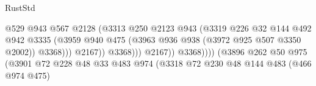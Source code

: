 \begin{lexlean}{RustStd}
\begin{coremodule}
{\begin{coremodule}
{{{{{{{{{{{{                                                          @529
                                                          @943
                                                          @567
                                                          @2128
                                                          (@3313
                                                            @250
                                                            @2123
                                                            @943
                                                            (@3319
                                                              @226
                                                              @32
                                                              @144
                                                              @492
                                                              @942
                                                              @3335
                                                              (@3959
                                                                @940
                                                                @475
                                                                (@3963
                                                                  @936
                                                                  @938
                                                                  (@3972 @925 @507 @3350 @2002))
                                                                @3368)))
                                                          @2167))
                                                      @3368)))
                                                @2167))
                                            @3368))))
                                    (@3896
                                      @262
                                      @50
                                      @975
                                      (@3901
                                        @72
                                        @228
                                        @48
                                        @33
                                        @483
                                        @974
                                        (@3318
                                          @72
                                          @230
                                          @48
                                          @144
                                          @483
                                          (@466 @974 @475)
}}}}}}}}}}}}
\end{coremodule}}
\end{coremodule}
\end{lexlean}
